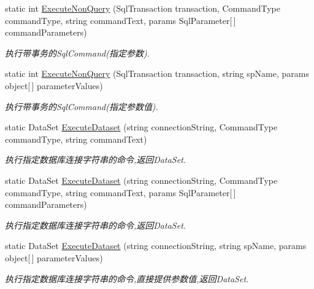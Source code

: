 \begin{DoxyCompactItemize}
static int \hyperlink{class_x_c_l_net_tools_1_1_data_base_1_1_m_s_s_q_l_1_1_sql_helper_a5de7d31376dfc5f991e9d72a776f6083}{Execute\-Non\-Query} (Sql\-Transaction transaction, Command\-Type command\-Type, string command\-Text, params Sql\-Parameter\mbox{[}$\,$\mbox{]} command\-Parameters)
\begin{DoxyCompactList}\small\item\em 执行带事务的\-Sql\-Command(指定参数). \end{DoxyCompactList}\item 
static int \hyperlink{class_x_c_l_net_tools_1_1_data_base_1_1_m_s_s_q_l_1_1_sql_helper_a220b490f5663d558a608164da5e17097}{Execute\-Non\-Query} (Sql\-Transaction transaction, string sp\-Name, params object\mbox{[}$\,$\mbox{]} parameter\-Values)
\begin{DoxyCompactList}\small\item\em 执行带事务的\-Sql\-Command(指定参数值). \end{DoxyCompactList}\item 
static Data\-Set \hyperlink{class_x_c_l_net_tools_1_1_data_base_1_1_m_s_s_q_l_1_1_sql_helper_a3418c950b693b80d623232b0d50c3924}{Execute\-Dataset} (string connection\-String, Command\-Type command\-Type, string command\-Text)
\begin{DoxyCompactList}\small\item\em 执行指定数据库连接字符串的命令,返回\-Data\-Set. \end{DoxyCompactList}\item 
static Data\-Set \hyperlink{class_x_c_l_net_tools_1_1_data_base_1_1_m_s_s_q_l_1_1_sql_helper_af4a5f8cf018d03e7535ff21eb149c625}{Execute\-Dataset} (string connection\-String, Command\-Type command\-Type, string command\-Text, params Sql\-Parameter\mbox{[}$\,$\mbox{]} command\-Parameters)
\begin{DoxyCompactList}\small\item\em 执行指定数据库连接字符串的命令,返回\-Data\-Set. \end{DoxyCompactList}\item 
static Data\-Set \hyperlink{class_x_c_l_net_tools_1_1_data_base_1_1_m_s_s_q_l_1_1_sql_helper_afc20f8a8ff547e53fe98526d493e598f}{Execute\-Dataset} (string connection\-String, string sp\-Name, params object\mbox{[}$\,$\mbox{]} parameter\-Values)
\begin{DoxyCompactList}\small\item\em 执行指定数据库连接字符串的命令,直接提供参数值,返回\-Data\-Set. \end{DoxyCompactList}\item 

\end{DoxyCompactItemize}
